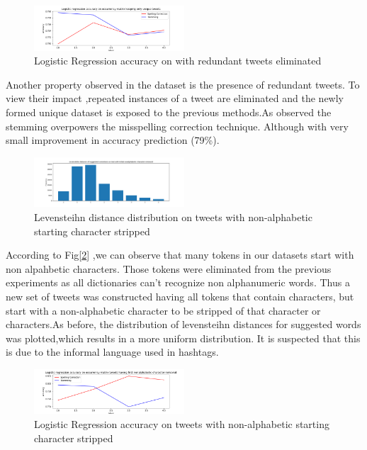\documentclass[10pt,conference,compsocconf]{IEEEtran}
\begin{document}
\begin{figure}[!htb]
	\centering \includegraphics[width=0.5\textwidth]{../plots/redundant.png}
	\caption{Logistic Regression accuracy on with redundant tweets eliminated}
	\label{unique}
\end{figure}

Another property observed in the dataset is the presence of redundant tweets. To view their impact ,repeated instances of a tweet are eliminated and the newly formed unique dataset is exposed to the previous methods.As observed the stemming overpowers the misspelling correction technique. Although with very small improvement in accuracy prediction (79\%).

\begin{figure}[!htb]
	\centering \includegraphics[width=0.5\textwidth]{../plots/distributionB.png}
	\caption{Levensteihn distance distribution on tweets with non-alphabetic starting character stripped}
	\label{levDistB}
\end{figure}

According to Fig[\ref{levDistB}] ,we can observe that many tokens in our datasets start with non alpahbetic characters. Those tokens were eliminated from the previous experiments as all dictionaries can't recognize non alphanumeric words. Thus  a new set of tweets was constructed having all tokens that contain characters, but start with a non-alphabetic character to be stripped of that character or characters.As before, the distribution of levensteihn distances for suggested words was plotted,which results in a more uniform distribution. It is suspected that this is due to the informal language used in hashtags. 

\begin{figure}[!htb]
	\centering \includegraphics[width=0.5\textwidth]{../plots/filtered_text.png}
	\caption{Logistic Regression accuracy on tweets with non-alphabetic starting character stripped }
	\label{filtered}
\end{figure}
\end{document}

